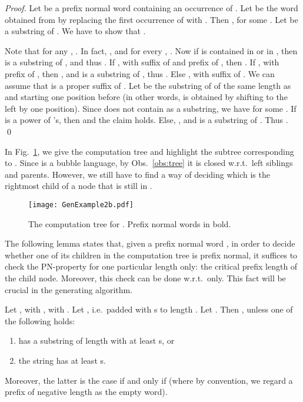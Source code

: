 \documentclass[11pt,a4paper]{llncs}
\begin{document}
\begin{proof}
Let  be a prefix normal word containing an occurrence of . Let  be the word obtained from  by replacing the first occurrence of  with . Then ,  for some . Let  be a substring of . We have to show that .
 
Note that for any , . In fact, , and for every , . Now if  is contained in  or in , then  is a substring of , and thus . If , with  suffix of  and  prefix of , then  . If , with  prefix of , then , and  is a substring of , thus . 
Else , with  suffix of . We can assume that  is a proper suffix of . Let  be the substring of  of the same length as  and starting one position before  (in other words,  is obtained by shifting  to the left by one position). Since  does not contain  as a substring, we have  for some . If  is a power of 's, then  and the claim holds. Else, , and  is a substring of . Thus . \hfill \qed
\end{proof}



In Fig.~\ref{fig:example2}, we give the computation tree  and highlight the subtree corresponding to .  Since  is a bubble language, by Obs.~\ref{obs:tree} it is closed w.r.t.\ left siblings and parents. However, we still have to find a way of deciding which is the rightmost child of a node that is still in .

\begin{figure}
\begin{center}
\texttt{[image: GenExample2b.pdf]}
\caption{\label{fig:example2}The computation tree  for . Prefix normal words in bold.}
\end{center}
\end{figure}




The following lemma states that, given a prefix normal word , in order to decide whether one of its children in the computation tree is prefix normal, it suffices to check the PN-property for one particular length only: the critical prefix length of the child node. Moreover, this check can be done w.r.t.\  only. This fact will be crucial in the generating algorithm.

\begin{lemma}\label{lemma:isPNF}
Let , with , with . Let , i.e.\  padded with s to length . Let . Then , unless one of the following holds:


\begin{enumerate}
\item  has a substring of length  with at least  s, or 
\item the string  has at least  s.
\end{enumerate}

Moreover, the latter is the case if and only if  (where by convention, we regard a prefix of negative length as the empty word).

\end{lemma}
\end{document}
